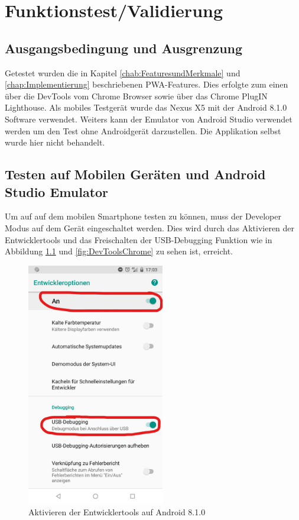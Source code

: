 \chapter{Funktionstest/Validierung}\label{chap:Funktionstest}
\thispagestyle{standard}
\pagestyle{standard}

\section{Ausgangsbedingung und Ausgrenzung}
Getestet wurden die in Kapitel \ref{chab:FeaturesundMerkmale} und \ref{chap:Implementierung} beschriebenen PWA-Features. Dies erfolgte zum einen über die DevTools vom Chrome Browser sowie über das Chrome PlugIN Lighthouse. 
Als mobiles Testgerät wurde das Nexus X5 mit der Android 8.1.0 Software verwendet.  
Weiters kann der Emulator von Android Studio verwendet werden um den Test ohne Androidgerät darzustellen. Die Applikation selbst wurde hier nicht behandelt.
 
\section{Testen auf Mobilen Geräten und Android Studio Emulator}
Um auf auf dem mobilen Smartphone testen zu können, muss der Developer Modus auf dem Gerät eingeschaltet werden. Dies wird durch das Aktivieren der Entwicklertools und das Freischalten der USB-Debugging Funktion wie in Abbildung \ref{fig:DevToolsAndorid} und \ref{fig:DevToolsChrome} zu sehen ist, erreicht. 

\begin{figure}[h]
	\centering
	\includegraphics[width=6cm]{BilderAllgemein/DevToolsAndroid}\medskip
	\caption{Aktivieren der Entwicklertools auf Android 8.1.0}
	\label{fig:DevToolsAndorid}
\end{figure}

